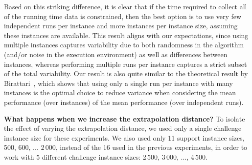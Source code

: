 \documentclass[aic]{iosart2x}
\begin{document}
Based on this striking difference, it is clear that if the time required to collect all of the running time data is constrained, then the best option is to use very few independent runs per instance and more instances per instance size, assuming these instances are available. This result aligns with our expectations, since using multiple instances captures variability due to both randomness in the algorithm (and/or noise in the execution environment) as well as differences between instances, whereas performing multiple runs per instance captures a strict subset of the total variability. Our result is also quite similar to the theoretical result by Birattari~\cite{Bir04}, which shows that using only a single run per instance with many instances is the optimal choice to reduce variance when considering the mean performance (over instances) of the mean performance (over independent runs). 

\textbf{What happens when we increase the extrapolation distance?}
To isolate the effect of varying the extrapolation distance, we used only a single challenge instance size for these experiments. 
We also used only 11 support instance sizes, 500, 600, ... 2\,000, instead of the 16 used in the previous experiments, in order to work with 5 different challenge instance sizes: 2\,500, 3\,000, ..., 4\,500.
\end{document}

